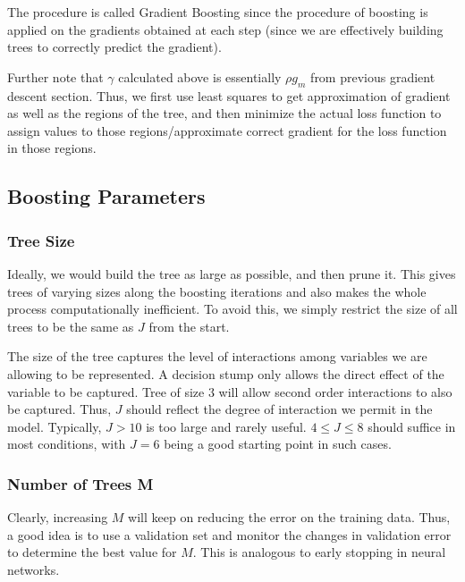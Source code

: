 \documentclass[../statistical_learning_notes.tex]{subfiles}
\begin{document}
The procedure is called Gradient Boosting since the procedure of boosting is applied on the gradients obtained at each step (since we are effectively building trees to correctly predict the gradient).\newline

Further note that $\gamma$ calculated above is essentially $\rho g_{m}$ from previous gradient descent section. Thus, we first use least squares to get approximation of gradient as well as the regions of the tree, and then minimize the actual loss function to assign values to those regions/approximate correct gradient for the loss function in those regions.


\subsection{Boosting Parameters}
\subsubsection{Tree Size}
Ideally, we would build the tree as large as possible, and then prune it. This gives trees of varying sizes along the boosting iterations and also makes the whole process computationally inefficient. To avoid this, we simply restrict the size of all trees to be the same as $J$ from the start.\newline

The size of the tree captures the level of interactions among variables we are allowing to be represented. A decision stump only allows the direct effect of the variable to be captured. Tree of size $3$ will allow second order interactions to also be captured. Thus, $J$ should reflect the degree of interaction we permit in the model. Typically, $J>10$ is too large and rarely useful. $4 \leq J \leq 8$ should suffice in most conditions, with $J=6$ being a good starting point in such cases.

\subsubsection{Number of Trees M}
Clearly, increasing $M$ will keep on reducing the error on the training data. Thus, a good idea is to use a validation set and monitor the changes in validation error to determine the best value for $M$. This is analogous to early stopping in neural networks.
\end{document}
